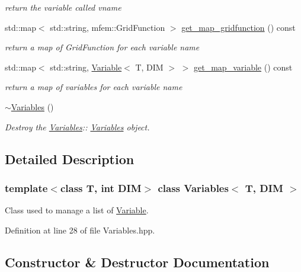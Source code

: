 \begin{DoxyCompactItemize}
\begin{DoxyCompactList}\small\item\em return the variable called vname \end{DoxyCompactList}\item 
std\+::map$<$ std\+::string, mfem\+::\+Grid\+Function $>$ \hyperlink{classVariables_a7ab9f249a888212662722a2ca0cae69f}{get\+\_\+map\+\_\+gridfunction} () const
\begin{DoxyCompactList}\small\item\em return a map of Grid\+Function for each variable name \end{DoxyCompactList}\item 
std\+::map$<$ std\+::string, \hyperlink{classVariable}{Variable}$<$ T, D\+IM $>$ $>$ \hyperlink{classVariables_a264223262f52f484b018cbe3d1f40fa8}{get\+\_\+map\+\_\+variable} () const
\begin{DoxyCompactList}\small\item\em return a map of variables for each variable name \end{DoxyCompactList}\item 
\mbox{\label{classVariables_ae98784407228932fdbd67ec09a42f294}} 
\hyperlink{classVariables_ae98784407228932fdbd67ec09a42f294}{$\sim$\+Variables} ()
\begin{DoxyCompactList}\small\item\em Destroy the \hyperlink{classVariables}{Variables}\+:\+: \hyperlink{classVariables}{Variables} object. \end{DoxyCompactList}\end{DoxyCompactItemize}


\subsection{Detailed Description}
\subsubsection*{template$<$class T, int D\+IM$>$\newline
class Variables$<$ T, D\+I\+M $>$}

Class used to manage a list of \hyperlink{classVariable}{Variable}. 

Definition at line 28 of file Variables.\+hpp.



\subsection{Constructor \& Destructor Documentation}
\mbox{\label{classVariables_a125cbddbe8bdfbb40e7b16ae6498b24c}} 
